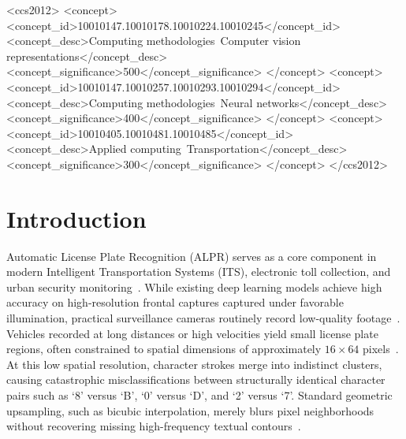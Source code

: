 \documentclass[sigconf]{acmart}
\begin{document}
\begin{CCSXML}
<ccs2012>
 <concept>
  <concept_id>10010147.10010178.10010224.10010245</concept_id>
  <concept_desc>Computing methodologies~Computer vision representations</concept_desc>
  <concept_significance>500</concept_significance>
 </concept>
 <concept>
  <concept_id>10010147.10010257.10010293.10010294</concept_id>
  <concept_desc>Computing methodologies~Neural networks</concept_desc>
  <concept_significance>400</concept_significance>
 </concept>
 <concept>
  <concept_id>10010405.10010481.10010485</concept_id>
  <concept_desc>Applied computing~Transportation</concept_desc>
  <concept_significance>300</concept_significance>
 </concept>
</ccs2012>
\end{CCSXML}



\maketitle

\section{Introduction}
\label{sec:intro}

Automatic License Plate Recognition (ALPR) serves as a core component in modern Intelligent Transportation Systems (ITS), electronic toll collection, and urban security monitoring~\cite{laroca2021anpr}. While existing deep learning models achieve high accuracy on high-resolution frontal captures captured under favorable illumination, practical surveillance cameras routinely record low-quality footage~\cite{goncalves2018realtime}. Vehicles recorded at long distances or high velocities yield small license plate regions, often constrained to spatial dimensions of approximately $16 \times 64$ pixels~\cite{icpr2026lrlpr}. At this low spatial resolution, character strokes merge into indistinct clusters, causing catastrophic misclassifications between structurally identical character pairs such as `8' versus `B', `0' versus `D', and `2' versus `7'. Standard geometric upsampling, such as bicubic interpolation, merely blurs pixel neighborhoods without recovering missing high-frequency textual contours~\cite{zhang2018rcan, shi2016pixelshuffle}.
\end{document}
